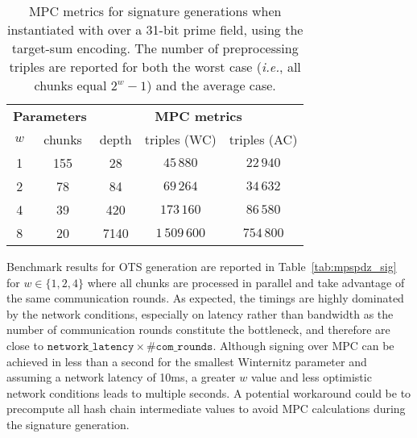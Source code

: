 \begin{table}[htbp]
	\centering
	\begin{tabular}{ccccc}
	\toprule
    	\multicolumn{2}{c}{\textbf{Parameters}}  & \multicolumn{3}{c}{\textbf{MPC metrics}} \\
    	{$w$} & chunks  &  depth & triples (WC) & triples (AC) \\
    	\midrule
 	 1 & 155 &  28  & $45\,880$     & $22\,940$ \\
	 2 & 78  &  84  & $69\,264$     & $34\,632$ \\
	 4 & 39  &  420 & $173\,160$    & $86\,580$ \\
	 8 & 20  & 7140 & $1\,509\,600$ & $754\,800$ \\
	\bottomrule
	\end{tabular}
	\caption{MPC metrics for \XMSS signature generations when instantiated with \PoseidonTwo over a 31-bit prime field, using the target-sum encoding. The number of preprocessing triples are reported for both the worst case (\textit{i.e.}, all chunks equal $2^w-1$) and the average case.\label{tab:xmss_sig_tsw}}
\end{table}

\noindent Benchmark results for OTS generation are reported in Table~\ref{tab:mpspdz_sig} for $w \in \{1,2,4\}$ where all chunks are processed in parallel and take advantage of the same communication rounds.
As expected, the timings are highly dominated by the network conditions, especially on latency rather than bandwidth as the number of communication rounds constitute the bottleneck, and therefore are close to $\mathtt{network\_latency} \times \#\mathtt{com\_rounds}$.
Although signing over MPC can be achieved in less than a second for the smallest Winternitz parameter and assuming a network latency of 10ms, a greater $w$ value and less optimistic network conditions leads to multiple seconds.
A potential workaround could be to precompute all hash chain intermediate values to avoid MPC calculations during the signature generation.


